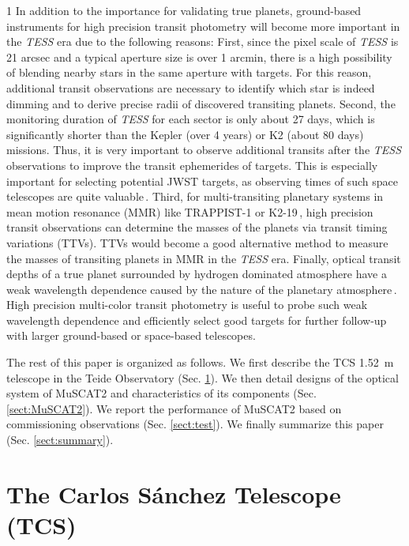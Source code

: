 \documentclass[a4paper,12pt]{spieman}  %
\begin{document}
\begin{spacing}{1}
In addition to the importance for validating true planets,
ground-based instruments for high precision transit photometry
will become more important in the {\it TESS} era due to the following reasons:
First, since the pixel scale of {\it TESS} is 21 arcsec\cite{2015JATIS...1a4003R}
and a typical aperture size is over 1 arcmin, 
there is a high possibility of blending nearby stars
in the same aperture with targets.
For this reason, additional transit observations are necessary
to identify which star is indeed dimming and
to derive precise radii of discovered transiting planets.
Second, the monitoring duration of {\it TESS} for each sector is only about 27 days,
which is significantly shorter than the Kepler (over 4 years) or
K2 (about 80 days) missions.
Thus, it is very important to observe additional transits after the {\it TESS}
observations to improve the transit ephemerides of targets.
This is especially important for selecting potential JWST targets,
as observing times of such space telescopes are
quite valuable\cite{2016AJ....152..171F}\,\!.
Third, for multi-transiting planetary systems in mean motion resonance (MMR)
like TRAPPIST-1\cite{2016Natur.533..221G} or
K2-19\cite{2015A&A...582A..33A,2015ApJ...815...47N}\,\!,
high precision transit observations can determine the masses
of the planets via transit timing variations (TTVs).
TTVs would become a good alternative method to measure the masses of
transiting planets in MMR in the {\it TESS} era.
Finally, optical transit depths of a true planet surrounded by hydrogen dominated atmosphere
have a weak wavelength dependence caused by the nature of the planetary
atmosphere\cite{2013ApJ...770...95F,2016A&A...585A.114P,2018ApJ...853....7K}\,\!.
High precision multi-color transit photometry is useful to probe such weak wavelength
dependence and efficiently select good targets for further follow-up with larger ground-based or
space-based telescopes.


The rest of this paper is organized as follows.
We first describe the TCS 1.52~m telescope in the Teide Observatory (Sec. \ref{sect:TCS}).
We then detail designs of the optical system of MuSCAT2 and characteristics of
its components (Sec. \ref{sect:MuSCAT2}).
We report the performance of MuSCAT2 based on commissioning observations (Sec. \ref{sect:test}).
We finally summarize this paper (Sec. \ref{sect:summary}).


\section{The Carlos S\'anchez Telescope (TCS)}
\label{sect:TCS}


\end{spacing}
\end{document}
